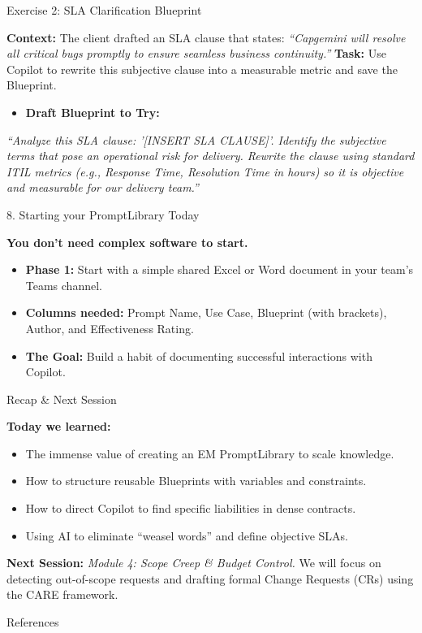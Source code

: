 \documentclass[aspectratio=169]{beamer}
\begin{document}
\begin{frame}{Exercise 2: SLA Clarification Blueprint}


\textbf{Context:} The client drafted an SLA clause that states: \textit{``Capgemini will resolve all critical bugs promptly to ensure seamless business continuity.''}
\textbf{Task:} Use Copilot to rewrite this subjective clause into a measurable metric and save the Blueprint.

\begin{itemize}
  \item \textbf{Draft Blueprint to Try:}
\end{itemize}
\textit{``Analyze this SLA clause: '[INSERT SLA CLAUSE]'. Identify the subjective terms that pose an operational risk for delivery. Rewrite the clause using standard ITIL metrics (e.g., Response Time, Resolution Time in hours) so it is objective and measurable for our delivery team.''}

\end{frame}

\begin{frame}{8. Starting your PromptLibrary Today}


\textbf{You don't need complex software to start.}

\begin{itemize}
  \item \textbf{Phase 1:} Start with a simple shared Excel or Word document in your team's Teams channel.
  \item \textbf{Columns needed:} Prompt Name, Use Case, Blueprint (with brackets), Author, and Effectiveness Rating.
  \item \textbf{The Goal:} Build a habit of documenting successful interactions with Copilot.
\end{itemize}
\end{frame}

\begin{frame}{Recap \& Next Session}


\textbf{Today we learned:}

\begin{itemize}
  \item The immense value of creating an EM PromptLibrary to scale knowledge.
  \item How to structure reusable Blueprints with variables and constraints.
  \item How to direct Copilot to find specific liabilities in dense contracts.
  \item Using AI to eliminate ``weasel words'' and define objective SLAs.
\end{itemize}
\textbf{Next Session:}
\textit{Module 4: Scope Creep \& Budget Control.} We will focus on detecting out-of-scope requests and drafting formal Change Requests (CRs) using the CARE framework.
\end{frame}



\begin{frame}[allowframebreaks]{References}
  
  
\end{frame}
\end{document}
